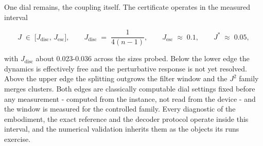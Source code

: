 One dial remains, the coupling itself. The certificate operates in the measured interval
\begin{widetext}
\begin{equation}\label{def:operating-window}
J \;\in\; \bigl[ J_{\mathrm{disc}},\, J_{\mathrm{esc}} \bigr], \qquad J_{\mathrm{disc}} \;=\; \frac{1}{4(n-1)}, \qquad J_{\mathrm{esc}} \;\approx\; 0.1, \qquad J^{*} \;\approx\; 0.05,
\end{equation}
\end{widetext}
with $J_{\mathrm{disc}}$ about 0.023-0.036 across the sizes probed. Below the lower edge the dynamics is effectively free and the perturbative response is not yet resolved. Above the upper edge the splitting outgrows the filter window and the $J^2$ family merges clusters. Both edges are classically computable dial settings fixed before any measurement - computed from the instance, not read from the device - and the window is measured for the controlled family. Every diagnostic of the embodiment, the exact reference and the decoder protocol operate inside this interval, and the numerical validation inherits them as the objects its runs exercise.

